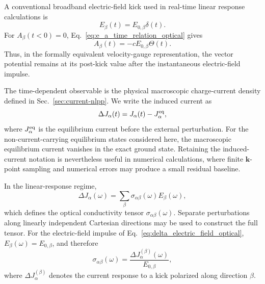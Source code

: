 A conventional broadband electric-field kick used in real-time linear
response calculations\cite{bertsch-96,jakowski-rmg-tddft-2025} is
\begin{equation}
  E_\beta(t)
  =
  E_{0,\beta}\delta(t).
  \label{eq:delta_electric_field_optical}
\end{equation}
For $A_\beta(t<0)=0$, Eq.~\eqref{eq:e_a_time_relation_optical} gives
\begin{equation}
  A_\beta(t)
  =
  -cE_{0,\beta}\Theta(t).
  \label{eq:step_vector_potential_optical}
\end{equation}
Thus, in the formally equivalent velocity-gauge representation, the
vector potential remains at its post-kick value after the instantaneous
electric-field impulse.

The time-dependent observable is the physical macroscopic charge-current
density defined in Sec.~\ref{sec:current-nlpp}.  We write the induced
current as
\begin{equation}
  \Delta J_\alpha(t)
  =
  J_\alpha(t)-J_\alpha^{\rm eq},
  \label{eq:induced_current_definition}
\end{equation}
where $J_\alpha^{\rm eq}$ is the equilibrium current before the external
perturbation.  For the non-current-carrying equilibrium states considered
here, the macroscopic equilibrium current vanishes in the exact ground
state.  Retaining the induced-current notation is nevertheless useful in
numerical calculations, where finite $\mathbf k$-point sampling and
numerical errors may produce a small residual baseline.

In the linear-response regime,
\begin{equation}
  \Delta J_\alpha(\omega)
  =
  \sum_\beta
  \sigma_{\alpha\beta}(\omega)
  E_\beta(\omega),
  \label{eq:conductivity_linear_response}
\end{equation}
which defines the optical conductivity tensor
$\sigma_{\alpha\beta}(\omega)$.  Separate perturbations along linearly
independent Cartesian directions may be used to construct the full
tensor.  For the electric-field impulse of
Eq.~\eqref{eq:delta_electric_field_optical},
$E_\beta(\omega)=E_{0,\beta}$, and therefore
\begin{equation}
  \sigma_{\alpha\beta}(\omega)
  =
  \frac{\Delta J_\alpha^{(\beta)}(\omega)}
       {E_{0,\beta}},
  \label{eq:conductivity_from_delta_kick}
\end{equation}
where $\Delta J_\alpha^{(\beta)}$ denotes the current response to a kick
polarized along direction $\beta$.

